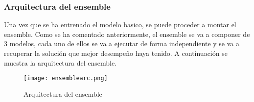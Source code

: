 \subsubsection{Arquitectura del ensemble}
Una vez que se ha entrenado el modelo basico, se puede proceder a montar el ensemble.
Como se ha comentado anteriormente, el ensemble se va a componer de 3 modelos, cada uno
de ellos se va a ejecutar de forma independiente y se va a recuperar la solución que 
mejor desempeño haya tenido. A continuación se muestra la arquitectura del ensemble.

\begin{figure}[ht]
    \centering
    \texttt{[image: ensemblearc.png]}
    \caption{Arquitectura del ensemble}
    \label{fig:ensemblearc}
\end{figure} 

